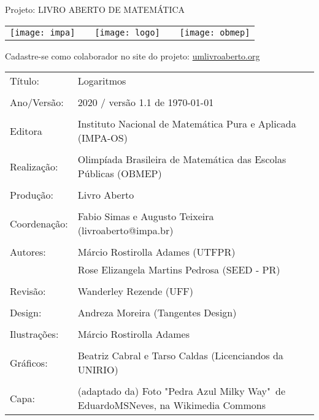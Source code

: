 \begin{center}
Projeto: LIVRO ABERTO DE MATEMÁTICA

\noindent \begin{tabular}{lcccr}
\texttt{[image: impa]}& \quad\quad& \texttt{[image: logo]} & \quad\quad& \texttt{[image: obmep]} 
\end{tabular}
\end{center}

\vspace*{.3cm}

Cadastre-se como colaborador no site do projeto: \url{umlivroaberto.org}




\begin{tabular}{p{}p{}}
Título: & Logaritmos\\
\\
Ano/Versão: & 2020 / versão 1.1 de \today\\
\\
Editora & Instituto Nacional de Matem\'atica Pura e Aplicada (IMPA-OS)\\
\\
Realização:& Olimp\'iada Brasileira de Matem\'atica das Escolas P\'ublicas (OBMEP)\\
\\
Produção:& Livro Aberto\\
\\
Coordenação:& Fabio Simas e Augusto Teixeira (livroaberto@impa.br)\\
\\
  Autores: & Márcio Rostirolla Adames (UTFPR)\\
             & Rose Elizangela Martins Pedrosa (SEED - PR)\\
\\
Revisão: & Wanderley Rezende (UFF) \\
                
\\
Design: & Andreza Moreira (Tangentes Design)\\
\\
  Ilustrações: & Márcio Rostirolla Adames \\ 
\\
Gráficos: & Beatriz Cabral e Tarso Caldas (Licenciandos da UNIRIO)\\
\\
Capa: & (adaptado da) Foto "Pedra Azul Milky Way"\, de EduardoMSNeves, na Wikimedia Commons  \\

\end{tabular}
\vspace{.5cm}



